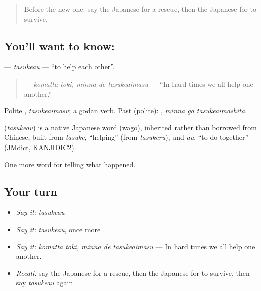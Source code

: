 \label{lesson:JA-C268-tasukeau}



\begin{quote}
Before the new one: say the Japanese for a rescue, then the Japanese for to survive.
\end{quote}

\subsection*{You'll want to know: }
\textbf{} — \emph{tasukeau} — \textquotedblleft{}to help each other\textquotedblright{}.

\begin{quote}
\textbf{  } — \emph{komatta toki, minna de tasukeaimasu} — \textquotedblleft{}In hard times we all help one another.\textquotedblright{}
\end{quote}

Polite \textbf{}, \emph{tasukeaimasu}; a godan verb. Past (polite): \textbf{ }, \emph{minna ga tasukeaimashita}.

\begin{cousinweb}
\textbf{} (\emph{tasukeau}) is a native Japanese word (wago), inherited rather than borrowed from Chinese, built from \emph{tasuke}, \textquotedblleft{}helping\textquotedblright{} (from \emph{tasukeru}), and \emph{au}, \textquotedblleft{}to do together\textquotedblright{} (JMdict, KANJIDIC2).
\end{cousinweb}

\begin{grammarlens}[title={What you've built}]
One more word for telling what happened.
\end{grammarlens}

\subsection*{Your turn}
\begin{itemize}
\raggedright
  \item \emph{Say it:} \emph{tasukeau}
  \item \emph{Say it:} \emph{tasukeau}, once more
  \item \emph{Say it:} \emph{komatta toki, minna de tasukeaimasu} — In hard times we all help one another.
  \item \emph{Recall:} say the Japanese for a rescue, then the Japanese for to survive, then say \emph{tasukeau} again
\end{itemize}

